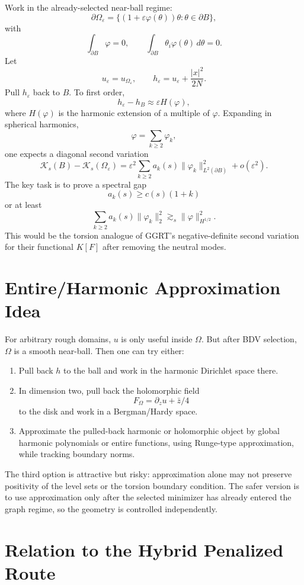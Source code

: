 \documentclass[11pt]{article}
\begin{document}
Work in the already-selected near-ball regime:
\[
\partial\Omega_\varepsilon
=
\{(1+\varepsilon\varphi(\theta))\theta:\theta\in\partial B\},
\]
with
\[
\int_{\partial B}\varphi=0,
\qquad
\int_{\partial B}\theta_i\varphi(\theta)\,d\theta=0.
\]
Let
\[
u_\varepsilon=u_{\Omega_\varepsilon},
\qquad
h_\varepsilon=u_\varepsilon+\frac{|x|^2}{2N}.
\]
Pull \(h_\varepsilon\) back to \(B\). To first order,
\[
h_\varepsilon-h_B
\approx
\varepsilon H(\varphi),
\]
where \(H(\varphi)\) is the harmonic extension of a multiple of \(\varphi\).
Expanding in spherical harmonics,
\[
\varphi=\sum_{k\ge2}\varphi_k,
\]
one expects a diagonal second variation
\[
\mathcal K_s(B)-\mathcal K_s(\Omega_\varepsilon)
=
\varepsilon^2
\sum_{k\ge2} a_k(s)\|\varphi_k\|_{L^2(\partial B)}^2
+o(\varepsilon^2).
\]
The key task is to prove a spectral gap
\[
a_k(s)\ge c(s)(1+k)
\]
or at least
\[
\sum_{k\ge2} a_k(s)\|\varphi_k\|_2^2
\gtrsim_s
\|\varphi\|_{H^{1/2}}^2.
\]
This would be the torsion analogue of GGRT's negative-definite second variation
for their functional \(K[F]\) after removing the neutral modes.

\section{Entire/Harmonic Approximation Idea}

For arbitrary rough domains, \(u\) is only useful inside \(\Omega\). But after
BDV selection, \(\Omega\) is a smooth near-ball. Then one can try either:
\begin{enumerate}
\item Pull back \(h\) to the ball and work in the harmonic Dirichlet space there.
\item In dimension two, pull back the holomorphic field
\[
F_\Omega=\partial_z u+\bar z/4
\]
to the disk and work in a Bergman/Hardy space.
\item Approximate the pulled-back harmonic or holomorphic object by global
harmonic polynomials or entire functions, using Runge-type approximation, while
tracking boundary norms.
\end{enumerate}
The third option is attractive but risky: approximation alone may not preserve
positivity of the level sets or the torsion boundary condition. The safer
version is to use approximation only after the selected minimizer has already
entered the graph regime, so the geometry is controlled independently.

\section{Relation to the Hybrid Penalized Route}
\end{document}
